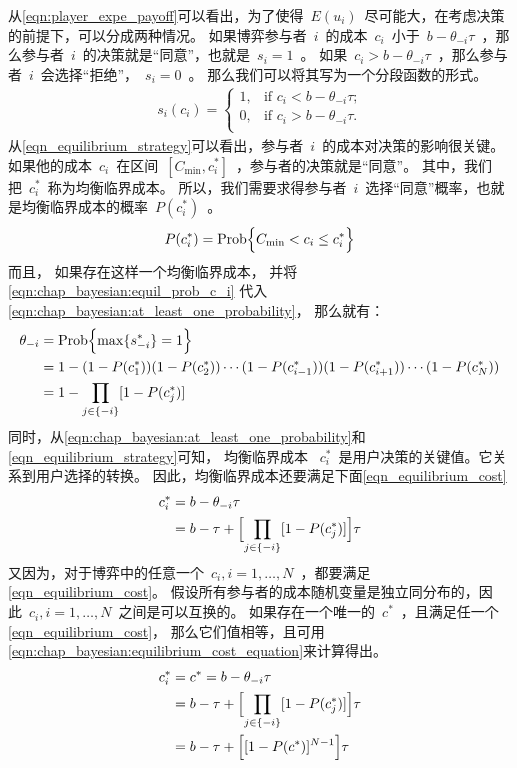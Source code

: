 从\eqref{eqn:player_expe_payoff}可以看出，为了使得~$E(u_i)$~尽可能大，在考虑决策的前提下，可以分成两种情况。
如果博弈参与者~$i$~的成本~$c_i$~小于~$b-\theta_{-i}\tau$~，那么参与者~$i$~的决策就是“同意”，也就是~$s_{i}=1$~。
如果~$c_i > b - \theta_{-i} \tau$~，那么参与者~$i$~会选择“拒绝”，~$s_i = 0$~。
那么我们可以将其写为一个分段函数的形式。
\begin{align}
    s_i(c_i) = \begin{cases} 1, &\text{if $c_i < b -\theta_{-i}\tau$;}\\
        0, &\text{if $c_i > b -\theta_{-i}\tau$.}\\ \end{cases} 
    \label{eqn_equilibrium_strategy} 
\end{align}
从\eqref{eqn_equilibrium_strategy}可以看出，参与者~$i$~的成本对决策的影响很关键。
如果他的成本~$c_i$~在区间~$ [C_{\min}, c_i^*] $~，参与者的决策就是“同意”。
其中，我们把~$c_i^*$~称为均衡临界成本。
所以，我们需要求得参与者~$i$~选择“同意”概率，也就是均衡临界成本的概率~$P(c_i^*)$~。
\begin{align}
    P(c_i^*) = \hbox{Prob} \Bigl\{ C_{\min} < c_i \leq c_i^* \Bigr\} 
    \label{eqn:chap_bayesian:equil_prob_c_i}
\end{align}
而且，
如果存在这样一个均衡临界成本，
并将\eqref{eqn:chap_bayesian:equil_prob_c_i} 代入\eqref{eqn:chap_bayesian:at_least_one_probability}，
那么就有：
\begin{align*} 
    \theta_{-i} &= \hbox{Prob} \Bigl\{ \max\{ s_{-i}^*\} = 1 \Bigr\} \\ 
    &= 1- (1-P(c_1^*))(1-P(c_2^*))\cdots(1-P(c_{i-1}^*)) (1-P(c_{i+1}^*)) \cdots(1-P(c_N^*)) \\ 
    &= 1- \prod_{j\in\{-i\}} [1-P(c_j^*)] 
\end{align*}
同时，从\eqref{eqn:chap_bayesian:at_least_one_probability}和\eqref{eqn_equilibrium_strategy}可知，
均衡临界成本 ~$c_i^*$~是用户决策的关键值。它关系到用户选择的转换。
因此，均衡临界成本还要满足下面\eqref{eqn_equilibrium_cost}
\begin{align}
    c_i^* &= b - \theta_{-i} \tau \notag\\
    &= b - \tau + \Bigl[ \prod_{j \in\{-i\} } [1 - P(c_j^*) ] \Bigr] \tau
    \label{eqn_equilibrium_cost} 
\end{align}
又因为，对于博弈中的任意一个~$c_i, i=1,\ldots, N$~，都要满足\eqref{eqn_equilibrium_cost}。
假设所有参与者的成本随机变量是独立同分布的，因此~$c_i, i=1,\ldots, N$~之间是可以互换的。
如果存在一个唯一的~$c^*$~，且满足任一个\eqref{eqn_equilibrium_cost}，
那么它们值相等，且可用\eqref{eqn:chap_bayesian:equilibrium_cost_equation}来计算得出。
\begin{align}  
    c_i^* &= c^* = b - \theta_{-i} \tau \notag\\ 
    &= b - \tau  + \Bigl[ \prod_{j \in\{-i\} } [1 - P(c_j^*) ] \Bigr] \tau \notag\\ 
    &= b - \tau + \Bigl[ [1 - P(c^*)]^{N-1} \Bigr] \tau
\label{eqn:chap_bayesian:equilibrium_cost_equation}
\end{align}

